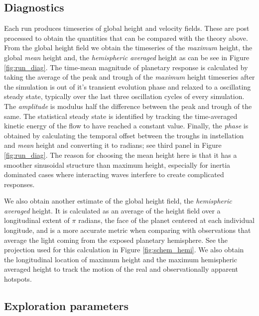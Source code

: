 \documentclass[trackchanges,twocolumn]{aastex7}
\begin{document}
\subsection{Diagnostics}
Each run produces timeseries of global height and velocity fields. These are post processed to obtain the quantities that can be compared with the theory above. From the global height field we obtain the timeseries of the \textit{maximum} height, the global \textit{mean} height and, the \textit{hemispheric averaged} height as can be see in Figure \ref{fig:run_diag}. The time-mean magnitude of planetary response is calculated by taking the average of the peak and trough of the \textit{maximum} height timeseries after the simulation is out of it's transient evolution phase and relaxed to a oscillating steady state, typically over the last three oscillation cycles of every simulation. The \textit{amplitude} is modulus half the difference between the peak and trough of the same. The statistical steady state is identified by tracking the time-averaged kinetic energy of the flow to have reached a constant value. Finally, the \textit{phase} is obtained by calculating the temporal offset between the troughs in instellation and \textit{mean} height and converting it to radians; see third panel in Figure \ref{fig:run_diag}. The reason for choosing the mean height here is that it has a smoother sinusoidal structure than maximum height, especially for inertia dominated cases where interacting waves interfere to create complicated responses. 

We also obtain another estimate of the global height field, the \textit{hemispheric averaged} height. It is calculated as an average of the height field over a longitudinal extent of $\pi$ radians, the face of the planet centered at each individual longitude, and is a more accurate metric when comparing with observations that average the light coming from the exposed planetary hemisphere. See the projection used for this calculation in Figure \ref{fig:schem_hemi}. We also obtain the longitudinal location of maximum height and the maximum hemispheric averaged height to track the motion of the real and observationally apparent hotspots. 

\subsection{Exploration parameters}
\label{sec:exploration}
\end{document}
